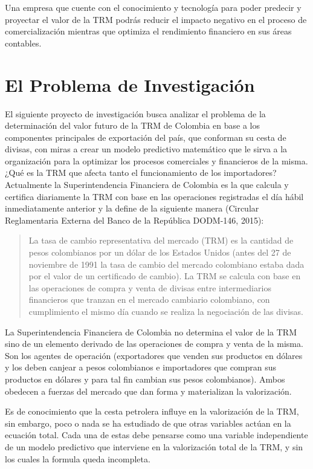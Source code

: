 \documentclass[letterpaper, spanish, 11pt]{report}
\begin{document}
Una empresa que cuente con el conocimiento y tecnología para poder predecir y proyectar el valor de la TRM podrás reducir el impacto negativo en el proceso de comercialización mientras que optimiza el rendimiento financiero en sus áreas contables.

\section{El Problema de Investigación}
El siguiente proyecto de investigación busca analizar el problema de la determinación del valor futuro de la TRM de Colombia en base a los componentes principales de exportación del país, que conforman su cesta de divisas, con miras a crear un modelo predictivo matemático que le sirva a la organización para la optimizar los procesos comerciales y financieros de la misma. ¿Qué es la TRM que afecta tanto el funcionamiento de los importadores? Actualmente la Superintendencia Financiera de Colombia es la que calcula y certifica diariamente la TRM con base en las operaciones registradas el día hábil inmediatamente anterior y la define de la siguiente manera (Circular Reglamentaria Externa del Banco de la República DODM-146, 2015):

\begin{quotation}
	La tasa de cambio representativa del mercado (TRM) es la cantidad de pesos colombianos por un dólar de los Estados Unidos (antes del 27 de noviembre de 1991 la tasa de cambio del mercado colombiano estaba dada por el valor de un certificado de cambio). La TRM se calcula con base en las operaciones de compra y venta de divisas entre intermediarios financieros que tranzan en el mercado cambiario colombiano, con cumplimiento el mismo día cuando se realiza la negociación de las divisas.
\end{quotation}

La Superintendencia Financiera de Colombia no determina el valor de la TRM sino de un elemento derivado de las operaciones de compra y venta de la misma. Son los agentes de operación (exportadores que venden sus productos en dólares y los deben canjear a pesos colombianos e importadores que compran sus productos en dólares y para tal fin cambian sus pesos colombianos). Ambos obedecen a fuerzas del mercado que dan forma y materializan la valorización.

Es de conocimiento que la cesta petrolera influye en la valorización de la TRM, sin embargo, poco o nada se ha estudiado de que otras variables actúan en la ecuación total. Cada una de estas debe pensarse como una variable independiente de un modelo predictivo que interviene en la valorización total de la TRM, y sin los cuales la formula queda incompleta.
\end{document}
